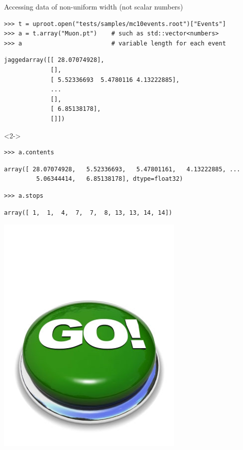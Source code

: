 \documentclass[aspectratio=169]{beamer}
\begin{document}
\begin{frame}[fragile]{Accessing data of non-uniform width (not scalar numbers)}
\vspace{0.25 cm}
\small
\begin{verbatim}
>>> t = uproot.open("tests/samples/mc10events.root")["Events"]
>>> a = t.array("Muon.pt")    # such as std::vector<numbers>
>>> a                         # variable length for each event
\end{verbatim}
\begin{verbatim}
jaggedarray([[ 28.07074928],
             [],
             [ 5.52336693  5.4780116 4.13222885],
             ...
             [],
             [ 6.85138178],
             []])
\end{verbatim}
\begin{uncoverenv}<2->
\begin{verbatim}
>>> a.contents
\end{verbatim}
\begin{verbatim}
array([ 28.07074928,   5.52336693,   5.47801161,   4.13222885, ...
         5.06344414,   6.85138178], dtype=float32)
\end{verbatim}
\begin{verbatim}
>>> a.stops
\end{verbatim}
\begin{verbatim}
array([ 1,  1,  4,  7,  7,  8, 13, 13, 14, 14])
\end{verbatim}
\end{uncoverenv}

\vspace{-7.7 cm}
\hfill \includegraphics[width=1.5 cm]{safe.png}\hspace{-0.9 cm}
\vspace{7.7 cm}
\end{frame}
\end{document}
